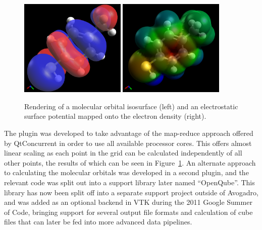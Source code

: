 \documentclass[10pt]{bmc_article}
\newenvironment{bmcformat}{\begin{raggedright}
\baselineskip20pt\sloppy\setboolean{publ}{false}}{\end{raggedright}
\baselineskip20pt\sloppy}
\begin{document}
\begin{bmcformat}
\begin{figure}
  \begin{center}
    \includegraphics[width=0.45\textwidth]{images/avo-mbt-orb}
    \hspace*{0.1cm}
    \includegraphics[width=0.45\textwidth]{images/avo-mbt-esp}
  \end{center}
  \caption{Rendering of a molecular orbital isosurface (left) and an electrostatic
  surface potential mapped onto the electron density (right).}
 \label{f:electronic-structure}
\end{figure}

The plugin was developed to take advantage of the map-reduce approach offered
by QtConcurrent in order to use all available processor cores. This offers almost
linear scaling as each point in the grid can be calculated independently of all other
points, the results of which can be seen in Figure~\ref{f:electronic-structure}.
An alternate approach to calculating the molecular orbitals was developed
in a second plugin, and the relevant code was split out into a support library later
named ``OpenQube''. This library has now been split off into a separate support
project outside of Avogadro, and was added as an optional backend in
VTK during the 2011 Google Summer of Code, bringing support for several
output file formats and calculation of cube files that can later be fed into more
advanced data pipelines.


\end{bmcformat}
\end{document}
